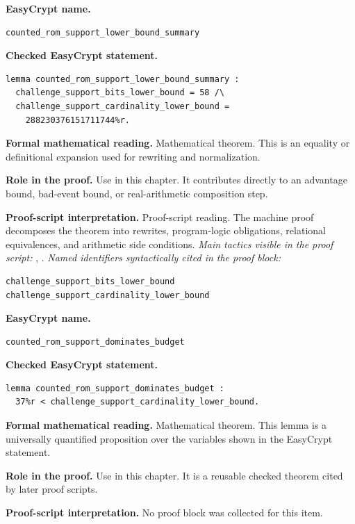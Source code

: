 \begin{formaltheorem}
\noindent\textbf{EasyCrypt name.}
\begin{lstlisting}[language=EasyCrypt,basicstyle=\ttfamily\scriptsize]
counted_rom_support_lower_bound_summary
\end{lstlisting}
\noindent\textbf{Checked EasyCrypt statement.}
\begin{lstlisting}[language=EasyCrypt,basicstyle=\ttfamily\scriptsize]
lemma counted_rom_support_lower_bound_summary :
  challenge_support_bits_lower_bound = 58 /\
  challenge_support_cardinality_lower_bound =
    288230376151711744%r.
\end{lstlisting}
\noindent\textbf{Formal mathematical reading.}
Mathematical theorem. This is an equality or definitional expansion used for rewriting and normalization.

\noindent\textbf{Role in the proof.}
Use in this chapter. It contributes directly to an advantage bound, bad-event bound, or real-arithmetic composition step.

\noindent\textbf{Proof-script interpretation.}
Proof-script reading. The machine proof decomposes the theorem into rewrites, program-logic obligations, relational equivalences, and arithmetic side conditions.
\emph{Main tactics visible in the proof script:} \ec{split}, \ec{rewrite}.
\emph{Named identifiers syntactically cited in the proof block:}
\begin{lstlisting}[language=EasyCrypt,basicstyle=\ttfamily\scriptsize]
challenge_support_bits_lower_bound
challenge_support_cardinality_lower_bound
\end{lstlisting}

\end{formaltheorem}

\begin{formaltheorem}
\noindent\textbf{EasyCrypt name.}
\begin{lstlisting}[language=EasyCrypt,basicstyle=\ttfamily\scriptsize]
counted_rom_support_dominates_budget
\end{lstlisting}
\noindent\textbf{Checked EasyCrypt statement.}
\begin{lstlisting}[language=EasyCrypt,basicstyle=\ttfamily\scriptsize]
lemma counted_rom_support_dominates_budget :
  37%r < challenge_support_cardinality_lower_bound.
\end{lstlisting}
\noindent\textbf{Formal mathematical reading.}
Mathematical theorem. This lemma is a universally quantified proposition over the variables shown in the EasyCrypt statement.

\noindent\textbf{Role in the proof.}
Use in this chapter. It is a reusable checked theorem cited by later proof scripts.

\noindent\textbf{Proof-script interpretation.}
No proof block was collected for this item.

\end{formaltheorem}

